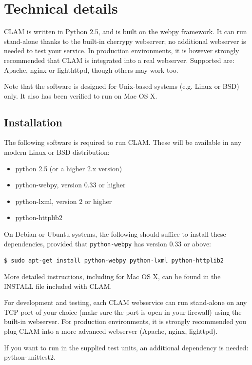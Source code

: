 \documentclass[a4paper,12pt]{report}
\begin{document}
\section{Technical details}

CLAM is written in Python 2.5, and is built on the webpy framework. It can run stand-alone thanks to the built-in cherrypy webserver; no additional webserver is needed to test your service. In production environments, it is however strongly recommended that CLAM is integrated into a real webserver. Supported are: Apache, nginx or lighthttpd, though others may work too.

 Note that the software is designed for Unix-based systems (e.g. Linux or BSD) only. It also has been verified to run on Mac OS X.

\subsection{Installation}

The following software is required to run CLAM. These will be available in any modern Linux or BSD distribution:

\begin{itemize}
\item python 2.5 (or a higher 2.x version)
\item python-webpy, version 0.33 or higher
\item python-lxml, version 2 or higher
\item python-httplib2
\end{itemize}

On Debian or Ubuntu systems, the following should suffice to install these dependencies, provided that \texttt{python-webpy} has version 0.33 or above:

\texttt{\$ sudo apt-get install python-webpy python-lxml python-httplib2 }

More detailed instructions, including for Mac OS X, can be found in the INSTALL file included with CLAM.

For development and testing, each CLAM webservice can run stand-alone on any TCP port of your choice (make sure the port is open in your firewall) using the built-in webserver. For production environments, it is strongly recommended you plug CLAM into a more advanced webserver (Apache, nginx, lighttpd). 

If you want to run in the supplied test units, an additional dependency is needed: python-unittest2.
\end{document}
